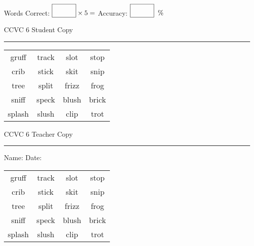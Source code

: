 \documentclass{memoir}
\begin{document}
\normalsize

Words Correct: $\fbox{\phantom{\huge 100}} \times 5 = $ Accuracy: $\fbox{\phantom{\huge 100}}\;\; \%$ 

\vfill

\newpage


\footnotesize \noindent
CCVC 6 \hfill Student Copy
\smallskip
\hrule

\Large

\setlength{\tabcolsep}{14pt}
\def\arraystretch{3}

{\selectfont


\begin{vplace}[0.5]
\begin{center}
\begin{tabular}{cccc}
gruff & track       & slot & stop \\
crib & stick & skit & snip \\
tree & split & frizz & frog \\
sniff & speck & blush & brick       \\
splash & slush & clip & trot \\
\end{tabular}
\end{center}
\end{vplace}

}

\newpage

\footnotesize \noindent
CCVC 6 \hfill Teacher Copy
\smallskip
\hrule

\normalsize

\vfill

\noindent
Name: \underline{\hspace{1.75in}} \hfill Date: \underline{\hspace{1in}}

\Large

{\selectfont


\begin{vplace}[0.5]
\begin{center}
\begin{tabular}{cccc}
gruff & track       & slot & stop \\
crib & stick & skit & snip \\
tree & split & frizz & frog \\
sniff & speck & blush & brick       \\
splash & slush & clip & trot \\
\end{tabular}
\end{center}
\end{vplace}



}
\end{document}
